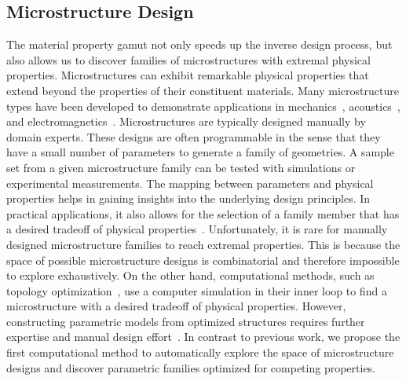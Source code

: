 \subsection{Microstructure Design}
The material property gamut not only speeds up the inverse design process,
but also allows us to discover families of microstructures with extremal physical properties.
Microstructures can exhibit remarkable physical properties that extend beyond the properties of their constituent materials.
Many microstructure types have been developed to demonstrate applications in mechanics~\cite{milton1995,Kadic2012,Meza2014,Zheng2014,Wang2016Therm,li2016mechanical},
acoustics~\cite{fang2006ultrasonic,li2009experimental},
and electromagnetics~\cite{schurig2006metamaterial,shalaev2007optical,magnus2008dc}.
Microstructures are typically designed manually by domain experts.
These designs are often programmable in the sense that they have a small number of parameters to generate a family of geometries.
A sample set from a given microstructure family can be tested with simulations or experimental measurements.
The mapping between parameters and physical properties helps in gaining insights into the underlying design principles.
In practical applications, it also allows for the selection of a family member that has a desired tradeoff of physical properties~\cite{gibson1982mechanics}.
Unfortunately, it is rare for manually designed microstructure families to reach extremal properties.
This is because the space of possible microstructure designs is combinatorial and therefore impossible to explore exhaustively.
On the other hand, computational methods, such as topology optimization~\cite{sigmund1994materials,sigmund1995tailoring,vogiatzis2017topology},
use a computer simulation in their inner loop to find a microstructure with a desired tradeoff of physical properties.
However, constructing parametric models from optimized structures requires further expertise and manual design effort~\cite{clausen2015topology}.
In contrast to previous work, we propose the first computational method to automatically explore the space of microstructure designs and discover parametric families optimized for competing properties.
